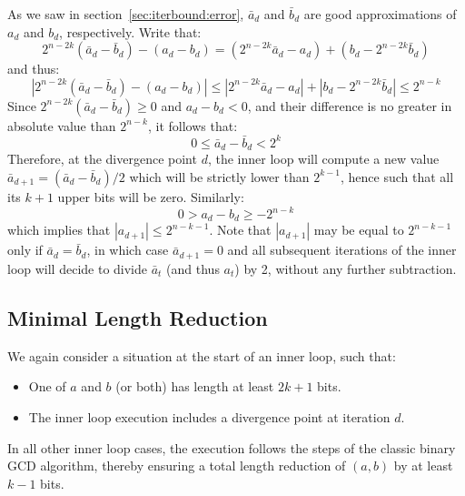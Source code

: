 \documentclass{llncs}
\begin{document}
As we saw in section~\ref{sec:iterbound:error}, $\bar a_d$ and $\bar b_d$
are good approximations of $a_d$ and $b_d$, respectively. Write that:
\begin{equation*}
    2^{n-2k} (\bar a_d - \bar b_d) - (a_d - b_d)
        = (2^{n-2k} \bar a_d - a_d) + (b_d - 2^{n-2k} \bar b_d)
\end{equation*}
and thus:
\begin{equation*}
    |2^{n-2k} (\bar a_d - \bar b_d) - (a_d - b_d)|
        \leq |2^{n-2k} \bar a_d - a_d| + |b_d - 2^{n-2k} \bar b_d|
        \leq 2^{n-k}
\end{equation*}
Since $2^{n-2k}(\bar a_d - \bar b_d) \geq 0$ and $a_d - b_d < 0$, and their
difference is no greater in absolute value than $2^{n-k}$, it follows that:
\begin{equation*}
    0 \leq \bar a_d - \bar b_d < 2^k
\end{equation*}
Therefore, at the divergence point $d$, the inner loop will compute a new
value $\bar a_{d+1} = (\bar a_d - \bar b_d)/2$ which will be strictly lower
than $2^{k-1}$, hence such that all its $k+1$ upper bits will be zero.
Similarly:
\begin{equation*}
    0 > a_d - b_d \geq -2^{n-k}
\end{equation*}
which implies that $|a_{d+1}| \leq 2^{n-k-1}$. Note that $|a_{d+1}|$ may
be equal to $2^{n-k-1}$ only if $\bar a_d = \bar b_d$, in which case $\bar
a_{d+1} = 0$ and all subsequent iterations of the inner loop will decide
to divide $\bar a_t$ (and thus $a_t$) by 2, without any further
subtraction.

\subsection{Minimal Length Reduction}\label{sec:iterbound:minred}

We again consider a situation at the start of an inner loop, such that:
\begin{itemize}

    \item One of $a$ and $b$ (or both) has length at least $2k+1$ bits.

    \item The inner loop execution includes a divergence point at
    iteration $d$.

\end{itemize}
In all other inner loop cases, the execution follows the steps of the
classic binary GCD algorithm, thereby ensuring a total length reduction
of $(a,b)$ by at least $k-1$ bits.
\end{document}
